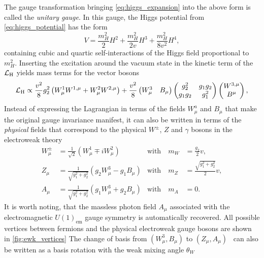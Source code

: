 The gauge transformation bringing \cref{eq:higgs_expansion} into the above form is called the \textit{unitary gauge}. In this gauge, the Higgs potential from \cref{eq:higgs_potential} has the form
\begin{equation}
	V = \frac{m_H^2}{2} H^2 + \frac{m_H^2}{2v} H^3 + \frac{m_H^2}{8v^2} H^4,
\end{equation}
containing cubic and quartic self-interactions of the Higgs field proportional to $m^2_H$. Inserting the excitation around the vacuum state in the kinetic term of the $\mathcal{L}_\mathrm{H}$ yields mass terms for the vector bosons
\begin{equation}
	\mathcal{L}_\mathrm{H} \propto \frac{v^2}{8}g^2_2\left(W_\mu^1W^{1,\mu} + W_\mu^2W^{2,\mu}\right) + \frac{v^2}{8} \begin{pmatrix}
		W^3_\mu & B_\mu
	\end{pmatrix}
	\begin{pmatrix}
		g_2^2 & g_1g_2   \\
		g_1g_2 & g_1^2
	\end{pmatrix}
	\begin{pmatrix}
		W^{3,\mu} \\
		B^\mu
	\end{pmatrix},
\end{equation}
Instead of expressing the Lagrangian in terms of the fields $W^a_\mu$ and $B_\mu$ that make the original gauge invariance manifest, it can also be written in terms of the \textit{physical} fields that correspond to the physical $W^\pm$, $Z$ and $\gamma$ bosons in the electroweak theory
\begin{align*}
	W^\pm_\mu 	& = \frac{1}{\sqrt{2}}(W^1_\mu\mp i W^2_\mu) 				& \textrm{with} \quad m_W  & = \frac{g_2}{2}v, \\
	Z_\mu 		& = \frac{1}{\sqrt{g_1^2+g_2^2}}(g_2W^3_\mu - g_1 B_\mu) 	& \textrm{with} \quad m_Z  & = \frac{\sqrt{g_1^2+g_2^2}}{2}v, \\
	A_\mu 		& = \frac{1}{\sqrt{g_1^2+g_2^2}}(g_1W^3_\mu + g_2 B_\mu) 	& \textrm{with} \quad m_A  & = 0.
\end{align*}
It is worth noting, that the massless photon field $A_\mu$ associated with the electromagnetic $U(1)_\mathrm{em}$ gauge symmetry is automatically recovered. All possible vertices between fermions and the physical electroweak gauge bosons are shown in \cref{fig:ewk_vertices} The change of basis from $(W^3_\mu, B_\mu)$ to $(Z_\mu,A_\mu)$~\cite{Peskin:1995ev} can also be written as a basis rotation with the weak mixing angle $\theta_W$ 
